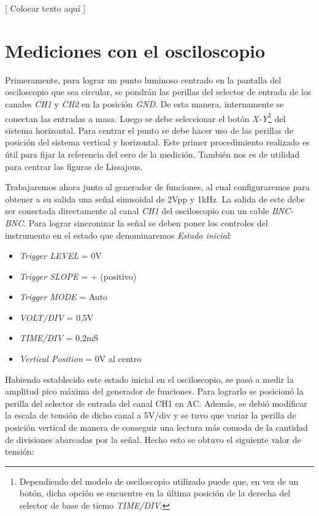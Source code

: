 \documentclass{article}
\begin{document}
	[ Colocar texto aquí ]
\bigskip\bigskip



\section{Mediciones con el osciloscopio}

	Primeramente, para lograr un punto luminoso centrado en la pantalla del osciloscopio que sea circular, se pondrán las perillas del selector de entrada de los canales \textit{CH1} y \textit{CH2} en la posición \textit{GND}. De esta manera, internamente se conectan las entradas a masa. Luego se debe seleccionar el botón \textit{X-Y}\footnote{Dependiendo del modelo de osciloscopio utilizado puede que, en vez de un botón, dicha opción se encuentre en la última posición de la derecha del selector de base de tiemo \textit{TIME/DIV}.} del sistema horizontal. Para centrar el punto se debe hacer uso de las perillas de posición del sistema vertical y horizontal.	Este primer procedimiento realizado es útil para fijar la referencia del cero de la medición. También nos es de utilidad para centrar las figuras de Lissajous.
	\par
	Trabajaremos ahora junto al generador de funciones, al cual configuraremos para obtener a su salida una señal sinusoidal de 2Vpp y 1kHz. La salida de este debe ser conectada directamente al canal \textit{CH1} del osciloscopio con un cable \textit{BNC-BNC}. Para lograr sincronizar la señal se deben poner los controles del instrumento en el estado que denominaremos \textit{Estado inicial}:
\medskip


\begin{itemize}
\itemsep=2pt \topsep=0pt \partopsep=0pt \parskip=0pt \parsep=0pt
	\item \textit{Trigger LEVEL} = 0V
	\item \textit{Trigger SLOPE} = + (positivo)
	\item \textit{Trigger MODE} = Auto
	\item \textit{VOLT/DIV} = 0,5V
	\item \textit{TIME/DIV} = 0,2mS
	\item \textit{Vertical Position} = 0V al centro
\end{itemize}
\medskip


	Habiendo establecido este estado inicial en el osciloscopio, se pasó a medir la amplitud pico máxima del generador de funciones. Para lograrlo se posicionó la perilla del selector de entrada del canal CH1 en AC. Además, se debió modificar la escala de tensión de dicho canal a 5V/div y se tuvo que variar la perilla de posición vertical de manera de conseguir una lectura más comoda de la cantidad de divisiones abarcadas por la señal. Hecho esto se obtuvo el siguiente valor de tensión:
\end{document}
